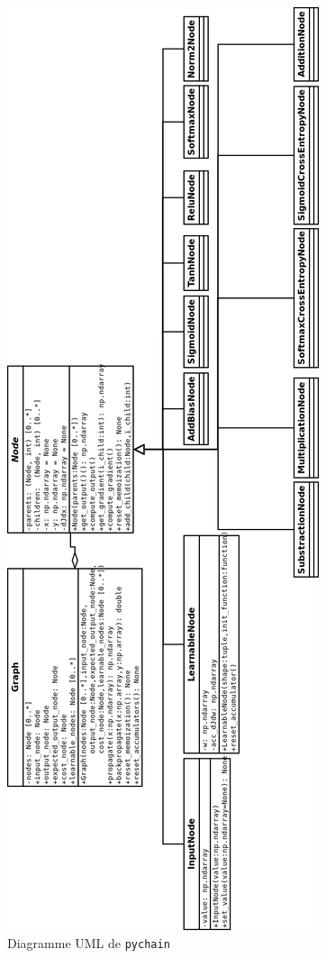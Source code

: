 \begin{figure}
\begin{center}
\includegraphics[scale=0.3]{images/chapter3/pychain_uml.png}
\caption{Diagramme UML de \texttt{pychain}}
\end{center}
\end{figure}

